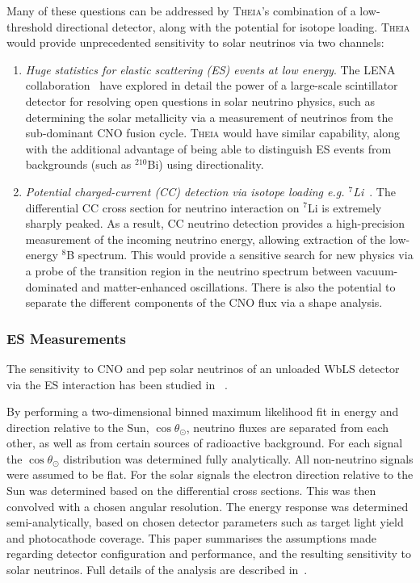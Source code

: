 Many of these questions can be addressed by \textsc{Theia}'s combination of a low-threshold directional detector, along with the potential for isotope loading.  \textsc{Theia} would provide unprecedented sensitivity to solar neutrinos via two channels:
\begin{enumerate}
\item {\it Huge statistics for elastic scattering (ES) events at low energy}.  
The LENA collaboration~\cite{lena} have explored in detail the power of a large-scale scintillator detector for resolving open questions in solar neutrino physics, such as determining the solar metallicity via a measurement of neutrinos from the sub-dominant CNO fusion cycle.  \textsc{Theia} would have similar capability, along with the additional advantage of being able to distinguish ES events from backgrounds (such as $^{210}$Bi) using directionality.

\item {\it Potential charged-current (CC) detection via isotope loading e.g. $^7$Li}~\cite{li}.  
The differential CC cross section for neutrino interaction on $^7$Li is extremely sharply peaked.  As a result, CC neutrino detection provides a high-precision measurement of the incoming neutrino energy, allowing extraction of the low-energy $^8$B spectrum. This would provide a sensitive search for new physics via a probe of the transition region in the neutrino spectrum between vacuum-dominated and matter-enhanced oscillations.  There is also the potential to separate the different components of the CNO flux via a shape analysis.

\end{enumerate}

\subsubsection{ES Measurements}
The sensitivity to CNO and pep solar neutrinos of an unloaded WbLS detector via the ES interaction has been studied in ~\cite{richiegdog}.  

By performing a two-dimensional  binned maximum likelihood fit  in energy and direction relative to the Sun, $\cos\theta_{\odot}$, neutrino fluxes are separated from each other, as well as  from certain sources of radioactive background.  
For each signal the $\cos\theta_{\odot}$ distribution was determined fully analytically.
All non-neutrino signals were assumed to be flat. For the solar signals the
electron direction relative to the Sun was determined
based on the differential cross sections. This was then convolved with a chosen angular resolution.  The energy response was determined semi-analytically, based on chosen detector parameters such as target light yield and photocathode coverage.  
This paper summarises the assumptions made regarding detector configuration and performance, and the resulting sensitivity to solar neutrinos. Full details of the analysis are described in~\cite{richiegdog}.  

